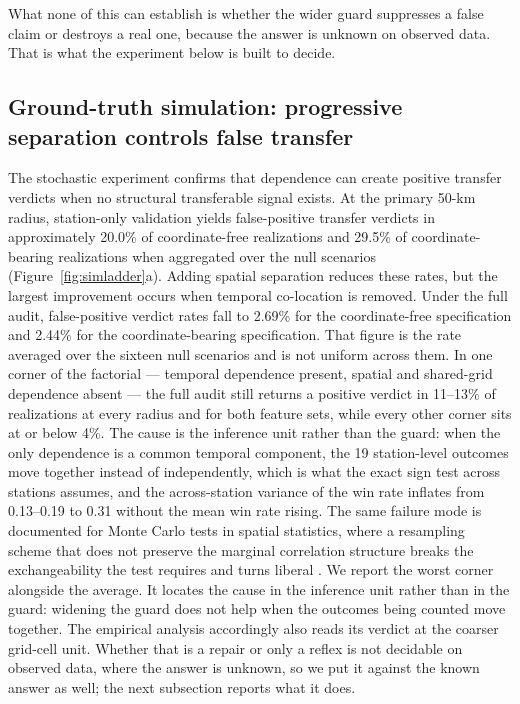 What none of this can establish is whether the wider guard suppresses a false claim or destroys a
real one, because the answer is unknown on observed data. That is what the experiment below is
built to decide.



\subsection{Ground-truth simulation: progressive separation controls false transfer}

The stochastic experiment confirms that dependence can create positive transfer verdicts when no structural transferable signal exists. At the primary 50-km radius, station-only validation yields false-positive transfer verdicts in approximately 20.0\% of coordinate-free realizations and 29.5\% of coordinate-bearing realizations when aggregated over the null scenarios (Figure~\ref{fig:simladder}a). Adding spatial separation reduces these rates, but the largest improvement occurs when temporal co-location is removed. Under the full audit, false-positive verdict rates fall to 2.69\% for the coordinate-free specification and 2.44\% for the coordinate-bearing specification. That figure is the rate averaged over the sixteen null scenarios and is not uniform across them. In one corner of the factorial --- temporal dependence present, spatial and shared-grid dependence absent --- the full audit still returns a positive verdict in 11--13\% of realizations at every radius and for both feature sets, while every other corner sits at or below 4\%. The cause is the inference unit rather than the guard: when the only dependence is a common temporal component, the 19 station-level outcomes move together instead of independently, which is what the exact sign test across stations assumes, and the across-station variance of the win rate inflates from 0.13--0.19 to 0.31 without the mean win rate rising. The same failure mode is documented for Monte Carlo tests in spatial statistics, where a resampling scheme that does not preserve the marginal correlation structure breaks the exchangeability the test requires and turns liberal \citep{mrkvicka2021randomshift}. We report the worst corner alongside the average. It locates the cause in the inference unit rather than in the guard: widening the guard does not help when the outcomes being counted move together. The empirical analysis accordingly also reads its verdict at the coarser grid-cell unit. Whether that is a repair or only a reflex is not decidable on observed data, where the answer is unknown, so we put it against the known answer as well; the next subsection reports what it does.

